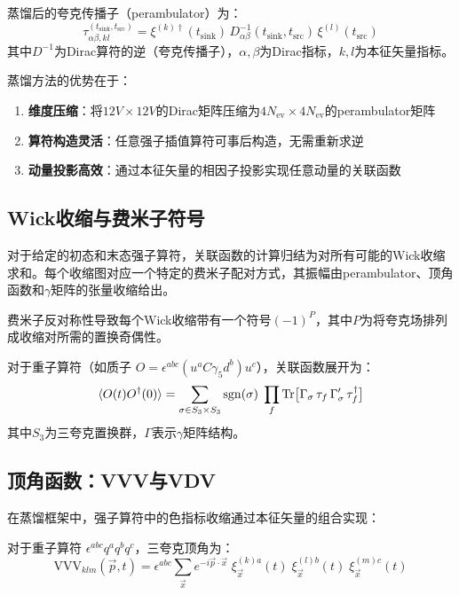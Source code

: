 \documentclass[11pt,a4paper]{ctexart}
\begin{document}
蒸馏后的夸克传播子（perambulator）为：
\begin{equation}
\tau^{(t_{\mathrm{sink}}, t_{\mathrm{src}})}_{\alpha\beta, kl}
= \xi^{(k)\dagger}(t_{\mathrm{sink}}) \, D^{-1}_{\alpha\beta}(t_{\mathrm{sink}}, t_{\mathrm{src}}) \, \xi^{(l)}(t_{\mathrm{src}})
\end{equation}
其中$D^{-1}$为Dirac算符的逆（夸克传播子），$\alpha,\beta$为Dirac指标，$k,l$为本征矢量指标。

蒸馏方法的优势在于：
\begin{enumerate}
\item \textbf{维度压缩}：将$12V \times 12V$的Dirac矩阵压缩为$4N_{\mathrm{ev}} \times 4N_{\mathrm{ev}}$的perambulator矩阵
\item \textbf{算符构造灵活}：任意强子插值算符可事后构造，无需重新求逆
\item \textbf{动量投影高效}：通过本征矢量的相因子投影实现任意动量的关联函数
\end{enumerate}

\subsection{Wick收缩与费米子符号}

对于给定的初态和末态强子算符，关联函数的计算归结为对所有可能的Wick收缩求和。每个收缩图对应一个特定的费米子配对方式，其振幅由perambulator、顶角函数和$\gamma$矩阵的张量收缩给出。

费米子反对称性导致每个Wick收缩带有一个符号$(-1)^P$，其中$P$为将夸克场排列成收缩对所需的置换奇偶性。

\begin{physicsbox}[Wick定理应用于强子关联函数]
对于重子算符（如质子 $O = \epsilon^{abc} (u^a C\gamma_5 d^b) u^c$），关联函数展开为：
\begin{equation}
\braket{O(t) O^{\dagger}(0)} = \sum_{\sigma \in S_3 \times S_3} \mathrm{sgn}(\sigma) \;
\prod_{f} \mathrm{Tr}\big[ \Gamma_{\sigma} \, \tau_f \, \Gamma'_{\sigma} \, \tau_f^{\dagger} \big]
\end{equation}
其中$S_3$为三夸克置换群，$\Gamma$表示$\gamma$矩阵结构。
\end{physicsbox}

\subsection{顶角函数：VVV与VDV}

在蒸馏框架中，强子算符中的色指标收缩通过本征矢量的组合实现：

\begin{physicsbox}
对于重子算符 $\epsilon^{abc} q^a q^b q^c$，三夸克顶角为：
\begin{equation}
\mathrm{VVV}_{klm}(\vec{p}, t) = \epsilon^{abc} \sum_{\vec{x}} e^{-i\vec{p}\cdot\vec{x}} \;
\xi^{(k)a}_{\vec{x}}(t) \; \xi^{(l)b}_{\vec{x}}(t) \; \xi^{(m)c}_{\vec{x}}(t)
\end{equation}
\end{physicsbox}
\end{document}

